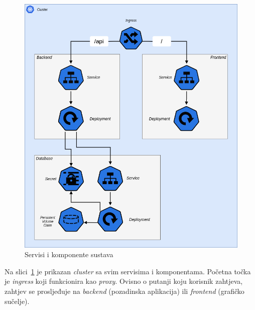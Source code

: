 \pagebreak

\begin{figure}[h!]
    \includegraphics[width=\textwidth]{images/app-infrastructure}
    \caption{Servisi i komponente sustava}
    \label{fig:application-infrastructure}
\end{figure}

Na slici~\ref{fig:application-infrastructure} je prikazan \textit{cluster} sa svim servisima i komponentama.
Početna točka je \textit{ingress} koji funkcionira kao \textit{proxy}.
Ovisno o putanji koju korisnik zahtjeva, zahtjev se prosljeđuje na \textit{backend} (pozadinska aplikacija) ili \textit{frontend} (grafičko sučelje).
